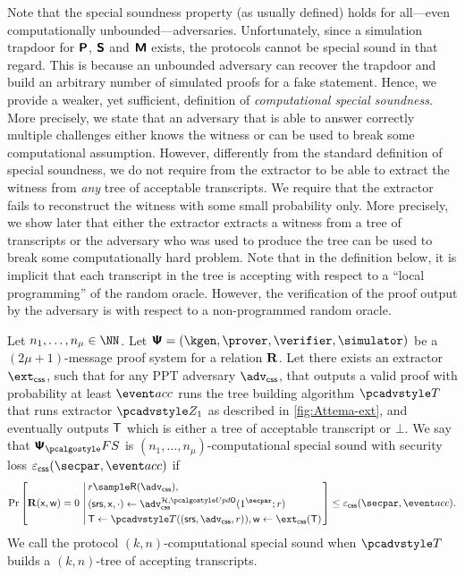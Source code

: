 Note that the special soundness property (as usually defined) holds for
all---even computationally unbounded---adversaries. Unfortunately, since a
simulation trapdoor for $\bm{\mathsf{P}}$, $\bm{\mathsf{S}}$ and $\bm{\mathsf{M}}$ exists, the protocols
cannot be special sound in that regard. This is because an unbounded adversary
can recover the trapdoor and build an arbitrary number of simulated proofs for a fake
statement. Hence, we provide a weaker, yet sufficient, definition of
\emph{computational special soundness}. More precisely, we state that an
adversary that is able to answer correctly multiple challenges either knows the
witness or can be used to break some computational assumption. However, differently from the standard definition of special soundness, we do not require from the extractor to be able to extract the witness from \emph{any} tree of acceptable transcripts.  We require that the extractor fails to reconstruct the witness with some small probability only. More precisely, we show later that either the extractor extracts a witness from a tree of transcripts or the adversary who was used to produce the tree can be used to break some computationally hard problem. Note that in the definition below, it is implicit that each transcript in the tree is accepting with respect to a ``local programming'' of the random oracle. However, the verification of the proof output by the adversary is with respect to a non-programmed random oracle.

\begin{definition}
	Let $n_1, \ldots, n_\mu \in \NN$. Let $\proofsystem = (\kgen, \prover, \verifier, \simulator)$ be a $(2 \mu + 1)$-message proof system for a relation $\mathbf{R}$. 
	Let there exists an extractor $\extcss$, such that for any PPT adversary $\advcss$, that outputs a valid proof with probability at least $\accProb$ runs the tree building algorithm $\tdv$ that runs extractor $\zdv_1$ as described in \cref{fig:Attema-ext}, and eventually outputs $\mathsf{T}$ which is either a tree of acceptable transcript or $\bot$. We say that $\psfs$ is $(n_1, \ldots, n_\mu)$-computational special sound with security loss $\epscss(\secpar, \accProb)$ if
	\begin{align*}
	\Pr\left[
	\REL(\inp, \wit) = 0
	\,\left|\,
	\begin{aligned}
	& 	r \sample \RND{\advcss}, \\
	& 	(\srs, \inp, \cdot) \gets \advcss^{\ro, \initU} (1^\secpar; r)\\
	&  	\tree \gets \tdv((\srs, \advcss, r)),
	\wit \gets \extcss(\tree)
	\end{aligned}\right.
	\right] \leq \epscss(\secpar,\accProb).
	\end{align*}
	 We call the protocol $(k, n)$-computational special sound when $\tdv$ builds a $(k, n)$-tree of accepting transcripts.
\end{definition}
	
